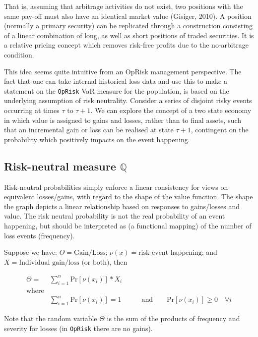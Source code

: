 \documentclass[]{DissertateUSU}
\begin{document}
That is, assuming that arbitrage activities do not exist, two positions
with the same pay-off must also have an identical market value (Gisiger,
2010). A position (normally a primary security) can be replicated
through a construction consisting of a linear combination of long, as
well as short positions of traded securities. It is a relative pricing
concept which removes risk-free profits due to the no-arbitrage
condition.\medskip

This idea seems quite intuitive from an OpRisk management perspective.
The fact that one can take internal historical loss data and use this to
make a statement on the \texttt{OpRisk} VaR measure for the population,
is based on the underlying assumption of risk neutrality. Consider a
series of disjoint risky events occurring at times \(\tau\) to
\(\tau + 1\). We can explore the concept of a two state economy in which
value is assigned to gains and losses, rather than to final assets, such
that an incremental gain or loss can be realised at state \(\tau + 1\),
contingent on the probability which positively impacts on the event
happening.\medskip

\subsection{Risk-neutral measure $\mathbb{Q}$}

Risk-neutral probabilities simply enforce a linear consistency for views
on equivalent losses/gains, with regard to the shape of the value
function. The shape the graph depicts a linear relationship based on
responses to gains/losses and value. The risk neutral probability is not
the real probability of an event happening, but should be interpreted as
(a functional mapping) of the number of loss events (frequency).\medskip

Suppose we have: \(\Theta = \mbox{Gain/Loss}\);
\(\nu(x) = \mbox{risk event happening}\); and
\(X = \mbox{Individual gain/loss (or both)}\), then

\begin{eqnarray}\label{eqn3}
\Theta = &\sum_{i=1}^{n}\mbox{Pr}[\nu (x_{i})]*X_i & \\
 \mbox{where} \nonumber\\
&\sum_{i=1}^{n}\mbox{Pr}[\nu (x_{i})] = 1 &\qquad \mbox{and} \qquad \mbox{Pr}[\nu (x_{i})] \geq 0 \quad \forall i\nonumber
\end{eqnarray}

Note that the random variable \(\Theta\) is the sum of the products of
frequency and severity for losses (in \texttt{OpRisk} there are no
gains).\medskip
\end{document}
